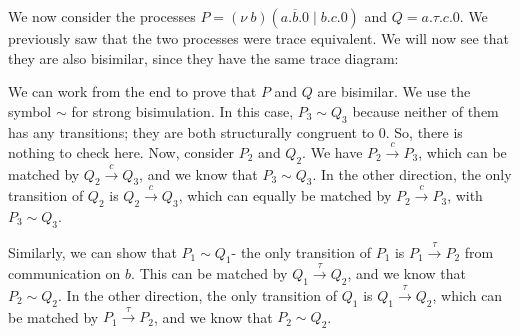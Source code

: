 \documentclass[a4paper, openany]{memoir}
\theoremstyle{definition}
\begin{document}
    We now consider the processes $P = (\nu \ b)(a.\overline{b}.0 \mid b.c.0)$ and $Q = a.\tau.c.0$. We previously saw that the two processes were trace equivalent. We will now see that they are also bisimilar, since they have the same trace diagram:
    \begin{figure}[H]
        \centering
    \end{figure}

    We can work from the end to prove that $P$ and $Q$ are bisimilar. We use the symbol $\sim$ for strong bisimulation. In this case, $P_3 \sim Q_3$ because neither of them has any transitions; they are both structurally congruent to $0$. So, there is nothing to check here. Now, consider $P_2$ and $Q_2$. We have $P_2 \xrightarrow{c} P_3$, which can be matched by $Q_2 \xrightarrow{c} Q_3$, and we know that $P_3 \sim Q_3$. In the other direction, the only transition of $Q_2$ is $Q_2 \xrightarrow{c} Q_3$, which can equally be matched by $P_2 \xrightarrow{c} P_3$, with $P_3 \sim Q_3$.

    Similarly, we can show that $P_1 \sim Q_1$- the only transition of $P_1$ is $P_1 \xrightarrow{\tau} P_2$ from communication on $b$. This can be matched by $Q_1 \xrightarrow{\tau} Q_2$, and we know that $P_2 \sim Q_2$. In the other direction, the only transition of $Q_1$ is $Q_1 \xrightarrow{\tau} Q_2$, which can be matched by $P_1 \xrightarrow{\tau} P_2$, and we know that $P_2 \sim Q_2$.
\end{document}

